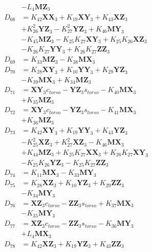 \begin{align}
&- L_4\mathbf{MZ}_3 \nonumber \\
D_{68} &= K_{42}\mathbf{XX}_3 + K_{19}\mathbf{XY}_3 + K_{43}\mathbf{XZ}_3  \nonumber \\
&+ K_{26}^2\mathbf{YZ}_3 - K_{27}^2\mathbf{YZ}_3 + K_{46}\mathbf{MY}_3  \nonumber \\
&- K_{45}\mathbf{MZ}_3 - K_{25}K_{27}\mathbf{XY}_3 + K_{25}K_{26}\mathbf{XZ}_3  \nonumber \\
&- K_{26}K_{27}\mathbf{YY}_3 + K_{26}K_{27}\mathbf{ZZ}_3 \nonumber \\
D_{69} &= K_{33}\mathbf{MZ}_3 - K_{38}\mathbf{MX}_3 \nonumber \\
D_{70} &= K_{28}\mathbf{XY}_3 + K_{10}\mathbf{YY}_3 + K_{29}\mathbf{YZ}_3  \nonumber \\
&- K_{39}\mathbf{MX}_3 + K_{34}\mathbf{MZ}_3 \nonumber \\
D_{71} &= \mathbf{XY}_3c_{torso} - \mathbf{YZ}_3s_{torso} - K_{40}\mathbf{MX}_3  \nonumber \\
&+ K_{35}\mathbf{MZ}_3 \nonumber \\
D_{72} &= \mathbf{XY}_3c_{torso} - \mathbf{YZ}_3s_{torso} - K_{41}\mathbf{MX}_3  \nonumber \\
&+ K_{36}\mathbf{MZ}_3 \nonumber \\
D_{73} &= K_{42}\mathbf{XY}_3 + K_{19}\mathbf{YY}_3 + K_{43}\mathbf{YZ}_3  \nonumber \\
&- K_{25}^2\mathbf{XZ}_3 + K_{27}^2\mathbf{XZ}_3 - K_{46}\mathbf{MX}_3  \nonumber \\
&+ K_{44}\mathbf{MZ}_3 + K_{25}K_{27}\mathbf{XX}_3 + K_{26}K_{27}\mathbf{XY}_3  \nonumber \\
&- K_{25}K_{26}\mathbf{YZ}_3 - K_{25}K_{27}\mathbf{ZZ}_3 \nonumber \\
D_{74} &= K_{11}\mathbf{MX}_3 - K_{33}\mathbf{MY}_3 \nonumber \\
D_{75} &= K_{28}\mathbf{XZ}_3 + K_{10}\mathbf{YZ}_3 + K_{29}\mathbf{ZZ}_3  \nonumber \\
&- K_{34}\mathbf{MY}_3 \nonumber \\
D_{76} &= \mathbf{XZ}_3c_{torso} - \mathbf{ZZ}_3s_{torso} + K_{37}\mathbf{MX}_3  \nonumber \\
&- K_{35}\mathbf{MY}_3 \nonumber \\
D_{77} &= \mathbf{XZ}_3c_{torso} - \mathbf{ZZ}_3s_{torso} - K_{36}\mathbf{MY}_3  \nonumber \\
&+ L_4\mathbf{MX}_3 \nonumber \\
D_{78} &= K_{42}\mathbf{XZ}_3 + K_{19}\mathbf{YZ}_3 + K_{43}\mathbf{ZZ}_3  \nonumber \\

\end{align}
